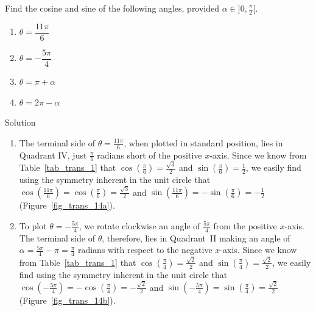 \begin{example}
 Find the cosine and sine of the following angles, provided $\alpha\in]0,\frac{\pi}{2}[$.

\begin{multicols}{2}

\begin{enumerate}

\item  $\theta = \dfrac{11 \pi}{6}$

\item  $\theta = -\dfrac{5 \pi}{4}$

\item  $\theta = \pi+\alpha$

\item $\theta=2\pi-\alpha$

\end{enumerate}

\end{multicols}
\pagebreak
{}Solution 

\begin{enumerate}

\item The terminal side of  $\theta = \frac{11\pi}{6}$, when plotted in standard position, lies in Quadrant IV, just $\frac{\pi}{6}$ radians short of the positive $x$-axis.  Since we know from Table~\ref{tab_trans_1} that $\cos\left(\frac{\pi}{6}\right)=\frac{\sqrt{3}}{2}$ and $\sin\left(\frac{\pi}{6}\right) =  \frac{1}{2}$, we easily find using the symmetry inherent in the unit circle that $\cos\left(\frac{11 \pi}{6} \right) = \cos\left(\frac{\pi}{6} \right) = \frac{\sqrt{3}}{2}$ and $\sin\left(\frac{11\pi}{6}\right) = -\sin\left(\frac{\pi}{6}\right) =  -\frac{1}{2}$ (Figure~\ref{fig_trans_14a}).

\item  To plot $\theta = -\frac{5\pi}{4}$, we rotate clockwise an angle of $\frac{5 \pi}{4}$ from the positive $x$-axis.  The terminal side of $\theta$, therefore, lies in Quadrant~II making an angle of $\alpha = \frac{5 \pi}{4} - \pi = \frac{\pi}{4}$ radians with respect to the negative $x$-axis.   Since  we know from Table~\ref{tab_trans_1} that $\cos\left(\frac{\pi}{4}\right) = \frac{\sqrt{2}}{2}$ and $\sin\left(\frac{\pi}{4}\right) = \frac{\sqrt{2}}{2}$, we easily find using the symmetry inherent in the unit circle that   $\cos\left(-\frac{5 \pi}{4}\right) = -\cos\left(\frac{\pi}{4}\right) = -\frac{\sqrt{2}}{2}$ and $\sin\left(-\frac{5 \pi}{4}\right) = \sin\left(\frac{\pi}{4}\right) = \frac{\sqrt{2}}{2}$ (Figure~\ref{fig_trans_14b}).


\end{enumerate}
\end{example}
